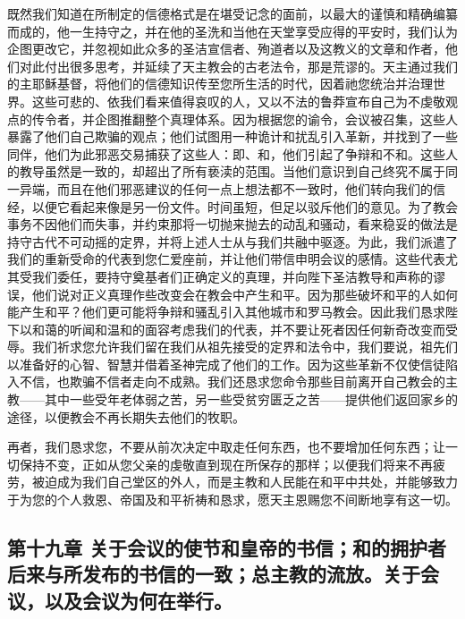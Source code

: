 既然我们知道在所制定的信德格式是在堪受记念的面前，以最大的谨慎和精确编纂而成的，他一生持守之，并在他的圣洗和当他在天堂享受应得的平安时，我们认为企图更改它，并忽视如此众多的圣洁宣信者、殉道者以及这教义的文章和作者，他们对此付出很多思考，并延续了天主教会的古老法令，那是荒谬的。天主通过我们的主耶稣基督，将他们的信德知识传至您所生活的时代，因着祂您统治并治理世界。这些可悲的、依我们看来值得哀叹的人，又以不法的鲁莽宣布自己为不虔敬观点的传令者，并企图推翻整个真理体系。因为根据您的谕令，会议被召集，这些人暴露了他们自己欺骗的观点；他们试图用一种诡计和扰乱引入革新，并找到了一些同伴，他们为此邪恶交易捕获了这些人：即、和，他们引起了争辩和不和。这些人的教导虽然是一致的，却超出了所有亵渎的范围。当他们意识到自己终究不属于同一异端，而且在他们邪恶建议的任何一点上想法都不一致时，他们转向我们的信经，以便它看起来像是另一份文件。时间虽短，但足以驳斥他们的意见。为了教会事务不因他们而失事，并约束那将一切抛来抛去的动乱和骚动，看来稳妥的做法是持守古代不可动摇的定界，并将上述人士从与我们共融中驱逐。为此，我们派遣了我们的重新受命的代表到您仁爱座前，并让他们带信申明会议的感情。这些代表尤其受我们委任，要持守奠基者们正确定义的真理，并向陛下圣洁教导和声称的谬误，他们说对正义真理作些改变会在教会中产生和平。因为那些破坏和平的人如何能产生和平？他们更可能将争辩和骚乱引入其他城市和罗马教会。因此我们恳求陛下以和蔼的听闻和温和的面容考虑我们的代表，并不要让死者因任何新奇改变而受辱。我们祈求您允许我们留在我们从祖先接受的定界和法令中，我们要说，祖先们以准备好的心智、智慧并借着圣神完成了他们的工作。因为这些革新不仅使信徒陷入不信，也欺骗不信者走向不成熟。我们还恳求您命令那些目前离开自己教会的主教——其中一些受年老体弱之苦，另一些受贫穷匮乏之苦——提供他们返回家乡的途径，以便教会不再长期失去他们的牧职。\par

再者，我们恳求您，不要从前次决定中取走任何东西，也不要增加任何东西；让一切保持不变，正如从您父亲的虔敬直到现在所保存的那样；以便我们将来不再疲劳，被迫成为我们自己堂区的外人，而是主教和人民能在和平中共处，并能够致力于为您的个人救恩、帝国及和平祈祷和恳求，愿天主恩赐您不间断地享有这一切。\par

\par


\subsection{第十九章 关于会议的使节和皇帝的书信；和的拥护者后来与所发布的书信的一致；总主教的流放。关于会议，以及会议为何在举行。}

